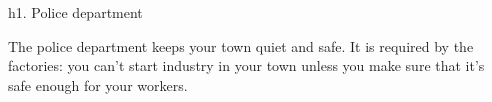 h1. Police department

The police department keeps your town quiet and safe. It is required by the factories: you can't start industry in your town unless you make sure that it's safe enough for your workers.